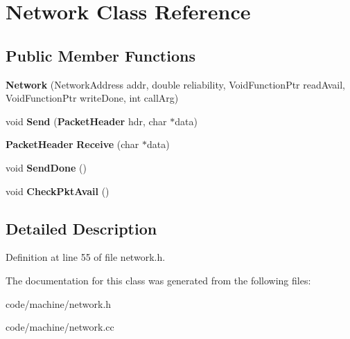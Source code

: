 \section{Network Class Reference}
\label{class_network}
\subsection*{Public Member Functions}
\begin{DoxyCompactItemize}
\item 
{\bfseries Network} (Network\+Address addr, double reliability, Void\+Function\+Ptr read\+Avail, Void\+Function\+Ptr write\+Done, int call\+Arg)\label{class_network_a0293c87c8c600e73383252a7c54b7c74}

\item 
void {\bfseries Send} ({\bf Packet\+Header} hdr, char $\ast$data)\label{class_network_ab68e75d65ef18f8a94a2f002c9e7f4ca}

\item 
{\bf Packet\+Header} {\bfseries Receive} (char $\ast$data)\label{class_network_a65fc6c013612cd582c099e46c1395066}

\item 
void {\bfseries Send\+Done} ()\label{class_network_ace79fd02d0d8404789162e991df951fe}

\item 
void {\bfseries Check\+Pkt\+Avail} ()\label{class_network_af33f61b6bb77606dc25805578e71abd0}

\end{DoxyCompactItemize}


\subsection{Detailed Description}


Definition at line 55 of file network.\+h.



The documentation for this class was generated from the following files\+:\begin{DoxyCompactItemize}
\item 
code/machine/network.\+h\item 
code/machine/network.\+cc\end{DoxyCompactItemize}
